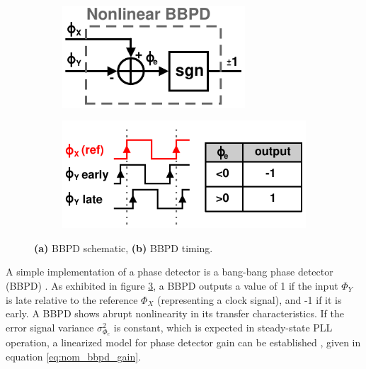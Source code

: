 		\begin{figure}[htb!]
		    \centering
		    \begin{subfigure}{0.5\textwidth}
		        \centering
		        \includegraphics[width=0.75\textwidth, angle=0]{./figs/theory/bbpd_nonlinear}
		        \caption{ }
		        \label{fig:bbpd_nonlinear}
		    \end{subfigure}%
		    \begin{subfigure}{0.5\textwidth}
		        \centering
		        \includegraphics[width=1\textwidth, angle=0]{./figs/theory/bbpd_timing}
		        \caption{ }
		        \label{fig:bbpd_timing}
		    \end{subfigure}

		    \caption{\textbf{(a)} BBPD schematic, \textbf{(b)} BBPD timing.}
		    \label{fig:bbpd_theory}
		\end{figure} 
			A simple implementation of a phase detector is a bang-bang phase detector (BBPD) \cite{zanuso_2009}. As exhibited in figure \ref{fig:bbpd_theory}, a BBPD outputs a value of 1 if the input $\Phi_Y$ is late relative to the reference $\Phi_X$ (representing a clock signal), and -1 if it is early. A BBPD shows abrupt nonlinearity in its transfer characteristics. If the error signal variance $\sigma_{\Phi_e}^2$ is constant, which is expected in steady-state PLL operation, a linearized model for phase detector gain can be established \cite{xu_abidi_2017}, given in equation \ref{eq:nom_bbpd_gain}.

